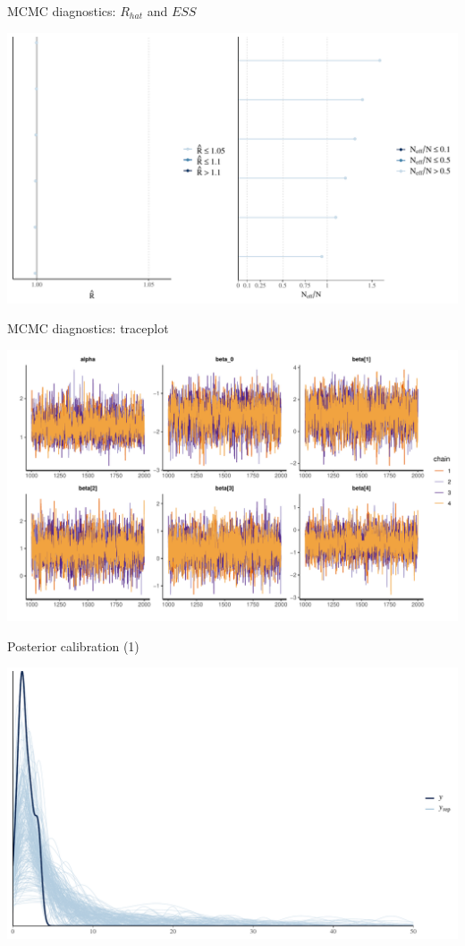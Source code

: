 \documentclass[ignorenonframetext,a4paper]{beamer}
\begin{document}
\begin{frame}{MCMC diagnostics: \(R_{hat}\) and \(ESS\)}

\includegraphics{DB_presentation_case_study_files/figure-beamer/unnamed-chunk-12-1.pdf}

\end{frame}

\begin{frame}{MCMC diagnostics: traceplot}

\includegraphics{DB_presentation_case_study_files/figure-beamer/unnamed-chunk-13-1.pdf}

\end{frame}

\begin{frame}{Posterior calibration (1)}

\includegraphics{DB_presentation_case_study_files/figure-beamer/unnamed-chunk-14-1.pdf}

\end{frame}
\end{document}
